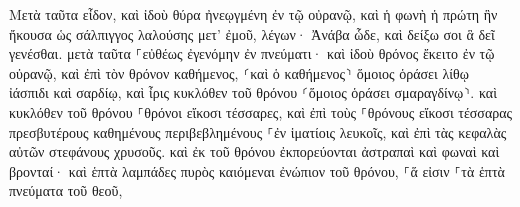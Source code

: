 \documentclass{openreader}
\begin{document}
Μετὰ ταῦτα εἶδον, καὶ ἰδοὺ θύρα ἠνεῳγμένη ἐν τῷ οὐρανῷ, καὶ ἡ φωνὴ ἡ πρώτη ἣν ἤκουσα ὡς σάλπιγγος λαλούσης μετ’ ἐμοῦ, λέγων· Ἀνάβα ὧδε, καὶ δείξω σοι ἃ δεῖ γενέσθαι. μετὰ ταῦτα 
⸀εὐθέως ἐγενόμην ἐν πνεύματι· καὶ ἰδοὺ θρόνος ἔκειτο ἐν τῷ οὐρανῷ, καὶ ἐπὶ τὸν θρόνον καθήμενος, 
⸂καὶ ὁ καθήμενος⸃ ὅμοιος ὁράσει λίθῳ ἰάσπιδι καὶ σαρδίῳ, καὶ ἶρις κυκλόθεν τοῦ θρόνου ⸂ὅμοιος ὁράσει σμαραγδίνῳ⸃. 
καὶ κυκλόθεν τοῦ θρόνου ⸀θρόνοι εἴκοσι τέσσαρες, καὶ ἐπὶ τοὺς ⸀θρόνους εἴκοσι τέσσαρας πρεσβυτέρους καθημένους περιβεβλημένους ⸀ἐν ἱματίοις λευκοῖς, καὶ ἐπὶ τὰς κεφαλὰς αὐτῶν στεφάνους χρυσοῦς. 
καὶ ἐκ τοῦ θρόνου ἐκπορεύονται ἀστραπαὶ καὶ φωναὶ καὶ βρονταί· καὶ ἑπτὰ λαμπάδες πυρὸς καιόμεναι ἐνώπιον τοῦ θρόνου, ⸀ἅ εἰσιν ⸀τὰ ἑπτὰ πνεύματα τοῦ θεοῦ, 
\end{document}
